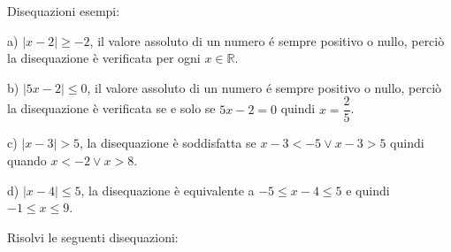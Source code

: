 \begin{esercizio}\label{ese:03.1}
Disequazioni esempi:
\begin{enumeratea}
        \item[a)] \(|x-2|\geq -2\), il valore assoluto di un numero é sempre 
positivo o nullo, perciò la disequazione è verificata per ogni \(x\in 
\mathbb{R}\).

        \item[b)] \(|5x-2|\leq 0\), il valore assoluto di un numero é sempre 
positivo o nullo, perciò la disequazione è verificata se e solo se \(5x-2=0\) 
quindi \(x=\dfrac{2}{5}\).
        \item[c)] \(|x-3|>5\), la disequazione è soddisfatta se \(x-3<-5 \vee 
x-3>5\) quindi quando \(x<-2 \vee x>8\).
        \item[d)] \(|x-4|\leq 5\), la disequazione è equivalente a \(-5\leq 
x-4 
\leq 5\) e quindi \(-1\leq x \leq 9\).
\end{enumeratea}

\noindent Risolvi le seguenti disequazioni:


\end{esercizio}
